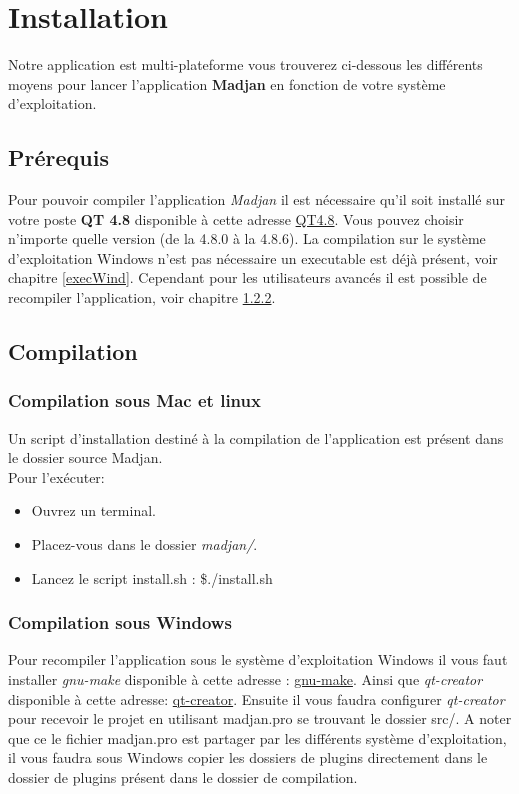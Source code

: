 \documentclass[pdftex,12pt,a4paper]{article}
\begin{document}
  \newpage  
  \section{Installation}
  Notre application est multi-plateforme  vous trouverez ci-dessous les différents moyens pour lancer l'application \textbf{Madjan} en fonction de votre système d'exploitation.
  
  	\subsection{Prérequis}
  Pour pouvoir compiler l'application \emph{Madjan} il est nécessaire qu'il soit installé sur votre poste \textbf{QT 4.8} disponible à cette adresse \hyperref[http://download.qt-project.org/archive/qt/4.8/]{QT4.8}. Vous pouvez choisir n'importe quelle version (de la 4.8.0 à la 4.8.6).
   La compilation sur  le système d'exploitation Windows n'est pas nécessaire un executable est déjà présent, voir chapitre \ref{execWind}. Cependant pour les utilisateurs avancés il est possible de  recompiler l'application, voir chapitre \ref{compilWind}.
   
  	\subsection{Compilation}
    
    	 \subsubsection{Compilation sous Mac et linux}
    	 	Un script d'installation destiné à la compilation de l'application est présent dans le dossier source Madjan.\\ 
            Pour l'exécuter:
           \begin{itemize}
           	 \item Ouvrez un terminal.
             \item Placez-vous dans le dossier \emph{madjan/}.
             \item Lancez le script install.sh : \$./install.sh
           \end{itemize}
           
   		 \subsubsection{Compilation sous Windows}\label{compilWind}
     Pour recompiler l'application sous le système d'exploitation  Windows il vous faut installer \emph{gnu-make} disponible à cette adresse : \hyperref[http://gnuwin32.sourceforge.net/packages/make.htm]{gnu-make}. Ainsi que \emph{qt-creator} disponible à cette adresse: \hyperref[http://sourceforge.net/projects/qtcreator.mirror/]{qt-creator}. Ensuite il vous faudra configurer \emph{qt-creator} pour recevoir le projet en utilisant madjan.pro se trouvant le dossier src/.
A noter que ce le fichier madjan.pro est partager par les différents système d'exploitation, il vous faudra sous Windows copier les dossiers de plugins directement dans le dossier de plugins présent dans le dossier de  compilation.
     \newpage
\end{document}
